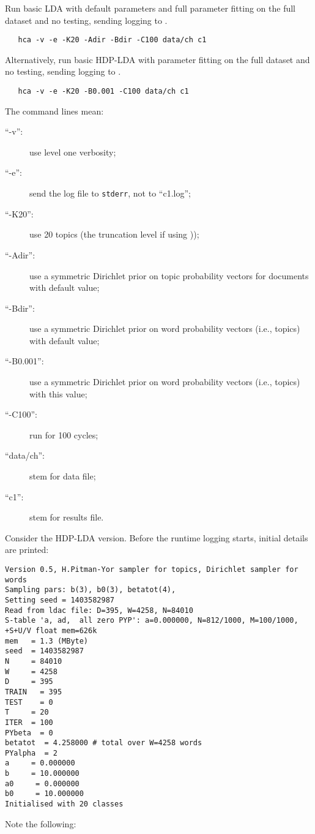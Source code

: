 \documentclass[a4paper,english]{article}
\begin{document}
Run basic LDA with default parameters
and full parameter fitting on the full dataset and no testing,
sending logging to .
\begin{verbatim}
   hca -v -e -K20 -Adir -Bdir -C100 data/ch c1
\end{verbatim}
Alternatively, 
run basic HDP-LDA with parameter fitting on the full dataset and no testing,
sending logging to .
\begin{verbatim}
   hca -v -e -K20 -B0.001 -C100 data/ch c1
\end{verbatim}
The command lines mean:
\begin{description}
\item[``-v'':] use level one verbosity;
\item[``-e'':] send the log file to  \texttt{stderr},
not to ``c1.log'';
\item[``-K20'':] use 20 topics 
(the truncation level if using ));
\item[``-Adir'':]  use a symmetric Dirichlet prior on topic probability
vectors for documents with default value;
\item[``-Bdir'':]  use a symmetric Dirichlet prior on word probability
vectors (i.e., topics) with default value;
\item[``-B0.001'':]  use a symmetric Dirichlet prior on word probability
vectors (i.e., topics) with this value;
\item[``-C100'':] run for 100 cycles;
\item[``data/ch'':] stem for data file;
\item[``c1'':] stem for results file.
\end{description}
Consider the HDP-LDA version.
Before the runtime logging starts, initial details are printed:
\begin{verbatim}
Version 0.5, H.Pitman-Yor sampler for topics, Dirichlet sampler for words
Sampling pars: b(3), b0(3), betatot(4),
Setting seed = 1403582987
Read from ldac file: D=395, W=4258, N=84010
S-table 'a, ad,  all zero PYP': a=0.000000, N=812/1000, M=100/1000, +S+U/V float mem=626k
mem   = 1.3 (MByte)
seed  = 1403582987
N     = 84010
W     = 4258
D     = 395
TRAIN   = 395
TEST    = 0
T     = 20
ITER  = 100
PYbeta  = 0
betatot  = 4.258000 # total over W=4258 words
PYalpha  = 2
a     = 0.000000
b     = 10.000000
a0     = 0.000000
b0     = 10.000000
Initialised with 20 classes
\end{verbatim}
Note the following:
\end{document}
